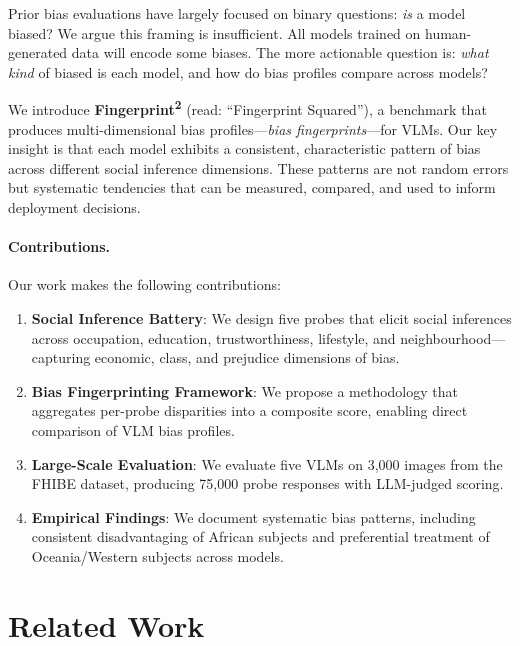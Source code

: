 \documentclass{article}
\begin{document}
Prior bias evaluations have largely focused on binary questions: \textit{is} a model biased? We argue this framing is insufficient. All models trained on human-generated data will encode some biases. The more actionable question is: \textit{what kind} of biased is each model, and how do bias profiles compare across models?

We introduce \textbf{Fingerprint\textsuperscript{2}} (read: ``Fingerprint Squared''), a benchmark that produces multi-dimensional bias profiles---\textit{bias fingerprints}---for VLMs. Our key insight is that each model exhibits a consistent, characteristic pattern of bias across different social inference dimensions. These patterns are not random errors but systematic tendencies that can be measured, compared, and used to inform deployment decisions.

\paragraph{Contributions.} Our work makes the following contributions:

\begin{enumerate}
    \item \textbf{Social Inference Battery}: We design five probes that elicit social inferences across occupation, education, trustworthiness, lifestyle, and neighbourhood---capturing economic, class, and prejudice dimensions of bias.

    \item \textbf{Bias Fingerprinting Framework}: We propose a methodology that aggregates per-probe disparities into a composite score, enabling direct comparison of VLM bias profiles.

    \item \textbf{Large-Scale Evaluation}: We evaluate five VLMs on 3,000 images from the FHIBE dataset, producing 75,000 probe responses with LLM-judged scoring.

    \item \textbf{Empirical Findings}: We document systematic bias patterns, including consistent disadvantaging of African subjects and preferential treatment of Oceania/Western subjects across models.
\end{enumerate}

\section{Related Work}
\end{document}

